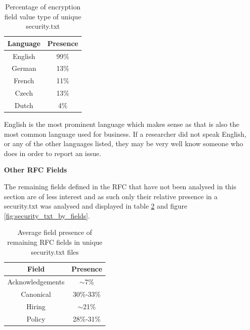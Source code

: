 \documentclass{mscreport}
\begin{document}
\begin{table}[H]
  \begin{center}
    \begin{tabular}{|c|c|}  %
      \hline
      \textbf{Language} & \textbf{Presence}\\
      \hline
      English & 99\%\\
      \hline
      German & 13\%\\
      \hline
      French & 11\%\\
      \hline
      Czech  & 13\%\\
      \hline
      Dutch & 4\%\\
      \hline
    \end{tabular}
    \caption{Percentage of encryption field value type of unique security.txt}
    \label{table:security_txt_preferred_languages} %
  \end{center}
\end{table}

\noindent
English is the most prominent language which makes sense as that is also the most common language used for business. If a researcher did not speak English, or any of the other languages listed, they may be very well know someone who does in order to report an issue.

\vspace{0.7cm} \noindent
\textbf{Other RFC Fields}

\noindent
The remaining fields defined in the RFC that have not been analysed in this section are of less interest and as such only their relative presence in a security.txt was analysed and displayed in table \ref{table:security_txt_by_other_rfc_fields} and figure \ref{fig:security_txt_by_fields}.

\begin{table}[H]
  \begin{center}
    \begin{tabular}{|c|c|}  %
      \hline
      \textbf{Field} & \textbf{Presence}\\
      \hline
      Acknowledgements & $\sim$7\%\\
      \hline
      Canonical & 30\%-33\%\\
      \hline
      Hiring & $\sim$21\%\\
      \hline
      Policy & 28\%-31\%\\
      \hline
    \end{tabular}
    \caption{Average field presence of remaining RFC fields in unique security.txt files}
    \label{table:security_txt_by_other_rfc_fields} %
  \end{center}
\end{table}
\end{document}
